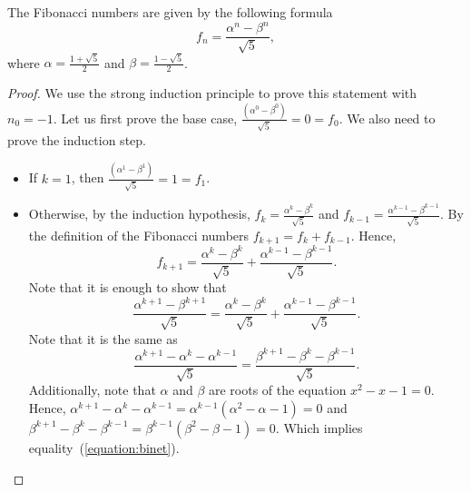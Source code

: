 \begin{theorem}
    The Fibonacci numbers are given by the following formula
    \[
        f_n = \frac{\alpha^n - \beta^n}{\sqrt{5}},
    \]
    where $\alpha = \frac{1 + \sqrt{5}}{2}$ and
    $\beta = \frac{1 - \sqrt{5}}{2}$.
\end{theorem}
\begin{proof}
    We use the strong induction principle to prove this statement with $n_0 = -1$.
    Let us first prove the base case,
    $\frac{(\alpha^0 - \beta^0)}{\sqrt{5}} = 0 = f_0$.
    We also need to prove the induction step.
    \begin{itemize}
        \item If $k = 1$, then $\frac{(\alpha^1 - \beta^1)}{\sqrt{5}} = 1 = f_1$.
        \item Otherwise, by the induction hypothesis,
            $f_k = \frac{\alpha^k - \beta^k}{\sqrt{5}}$ and
            $f_{k - 1} = \frac{\alpha^{k - 1} - \beta^{k - 1}}{\sqrt{5}}$.
            By the definition of the Fibonacci numbers $f_{k + 1} = f_k + f_{k - 1}$.
            Hence,
            \[
                f_{k + 1} = \frac{\alpha^k - \beta^k}{\sqrt{5}} +
                \frac{\alpha^{k - 1} - \beta^{k - 1}}{\sqrt{5}}.
            \]
            Note that it is enough to show that
            \begin{equation}
            \label{equation:binet}
                \frac{\alpha^{k + 1} - \beta^{k + 1}}{\sqrt{5}} =
                \frac{\alpha^k - \beta^k}{\sqrt{5}} +
                \frac{\alpha^{k - 1} - \beta^{k - 1}}{\sqrt{5}}.
            \end{equation}
            Note that it is the same as
            \[
                \frac{\alpha^{k + 1} - \alpha^k - \alpha^{k - 1}}{\sqrt{5}} =
                \frac{\beta^{k + 1} - \beta^k - \beta^{k - 1}}{\sqrt{5}}.
            \]
            Additionally, note that $\alpha$ and $\beta$ are roots of the equation
            $x^2 - x - 1 = 0$. Hence,
            $\alpha^{k + 1} - \alpha^k - \alpha^{k - 1} = \alpha^{k - 1}(\alpha^2 -
            \alpha - 1) = 0$ and
            $\beta^{k + 1} - \beta^k - \beta^{k - 1} =
            \beta^{k - 1}(\beta^2 - \beta - 1) = 0$. Which implies
            equality~(\ref{equation:binet}).
    \end{itemize}
\end{proof}

